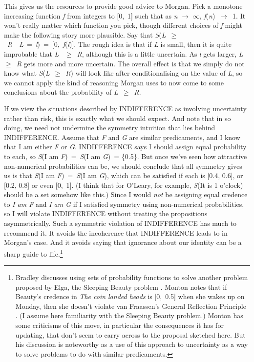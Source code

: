  This gives us the resources to provide good advice to Morgan. Pick a monotone increasing function \textit{f} from integers to [0,~1] such that as \textit{n} ${\rightarrow}$ ${\infty}$, \textit{f}(\textit{n})~${\rightarrow}$~1. It won't really matter which function you pick, though different choices of \textit{f} might make the following story more plausible. Say that \textit{S}(\textit{L}~${\geq}$~\textit{R}~{\textbar}~\textit{L}~=~\textit{l})~=~[0,~\textit{f}(\textit{l})]. The rough idea is that if \textit{L} is small, then it is quite improbable that \textit{L }~${\geq}$~\textit{R}, although this is a little uncertain. As \textit{l} gets larger, \textit{L}~${\geq}$~\textit{R} gets more and more uncertain. The overall effect is that we simply do not know what \textit{S}(\textit{L}~${\geq}$~\textit{R}) will look like after conditionalising on the value of \textit{L}, so we cannot apply the kind of reasoning Morgan uses to now come to some conclusions about the probability of \textit{L}~${\geq}$~\textit{R}.

If we view the situations described by INDIFFERENCE as involving uncertainty rather than risk, this is exactly what we should expect. And note that in so doing, we need not undermine the symmetry intuition that lies behind INDIFFERENCE. Assume that \textit{F} and \textit{G} are similar predicaments, and I know that I am either \textit{F} or \textit{G}. INDIFFERENCE says I should assign equal probability to each, so \textit{S}(I am \textit{F})~=~\textit{S}(I am \textit{G})~= \{0.5\}. But once we've seen how attractive non\nobreakdash-numerical probabilities can be, we should conclude that all symmetry gives us is that \textit{S}(I am \textit{F})~=~\textit{S}(I am \textit{G}), which can be satisfied if each is [0.4, 0.6], or [0.2, 0.8] or even [0,~1]. (I think that for O'Leary, for example, \textit{S}(It is 1 o'clock) should be a set somehow like this.) Since I would \textit{not} be assigning equal credence to \textit{I am F} and \textit{I am G} if I satisfied symmetry using non-numerical probabilities, so I will violate INDIFFERENCE without treating the propositions asymmetrically. Such a symmetric violation of INDIFFERENCE has much to recommend it. It avoids the incoherence that INDIFFERENCE leads to in Morgan's case. And it avoids saying that ignorance about our identity can be a sharp guide to life.\footnote{Bradley \citet{monton2002} discusses using sets of probability functions to solve another problem proposed by Elga, the Sleeping Beauty problem \citep{Elga2000-ELGSBA}. Monton notes that if Beauty's credence in \textit{The coin landed heads} is [0,~0.5] when she wakes up on Monday, then she doesn't violate van Fraassen's General Reflection Principle \citep{vanFraassen1995}. (I assume here familiarity with the Sleeping Beauty problem.) Monton has some criticisms of this move, in particular the consequences it has for updating, that don't seem to carry across to the proposal sketched here. But his discussion is noteworthy as a use of this approach to uncertainty as a way to solve problems to do with similar predicaments.}

